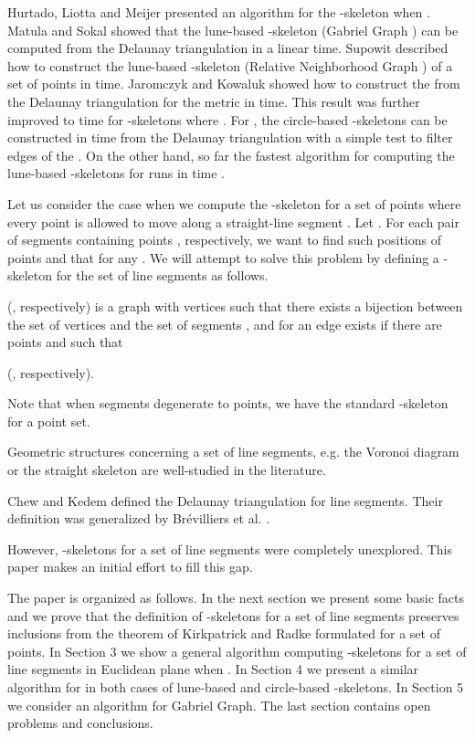 \documentclass[11pt]{llncs}
\begin{document}
Hurtado, Liotta and Meijer \cite{hlm03} presented an  algorithm for
the -skeleton when .
Matula and Sokal \cite{ms84} showed that the lune-based -skeleton (Gabriel Graph
) can be computed from the Delaunay triangulation in a linear time.
Supowit \cite{su83} described how to construct the lune-based -skeleton (Relative 
Neighborhood Graph ) of a set of  points in  time.
Jaromczyk and Kowaluk \cite{jk87} showed how to construct the  
from the Delaunay triangulation  for the  metric  
in  time.
This result was further improved to  time \cite{l94} for -skeletons 
where .
For , the  circle-based -skeletons can be 
constructed in  time from the  Delaunay triangulation  
with a simple test to filter edges of the   \cite{e02}.
On the other hand, so far the fastest algorithm for computing the lune-based 
-skeletons for  runs in  
time \cite{k12}.
 


 Let us consider the case when we compute the -skeleton for a set of  points 
 where every point  is allowed to move along a straight-line segment . 
Let . 
For each pair of segments  containing points , 
respectively, we want to find such positions of points  
and  that 
 for any . 
We will attempt to solve this problem 
by defining a -skeleton for the set of line segments  as follows.


\begin{definition}
 (, respectively) is a graph with  vertices such that there exists a bijection between the set of vertices and the set of segments ,
and for  an edge  exists
if there are points  and  such that 

(, 
respectively).
\end{definition}

Note that when segments degenerate to points, we have the standard -skeleton 
for a point set.

Geometric structures concerning a set of line segments, e.g. the Voronoi diagram 
\cite{bms84,pz13} or the straight skeleton \cite{aa96} are well-studied in the literature.

Chew and Kedem \cite{ck89} defined the Delaunay triangulation for line segments.
Their definition was generalized by Br\'{e}villiers et al. \cite{bcs07}.  

However, -skeletons for a set of line segments were completely unexplored.
This paper makes an initial effort to fill this gap.

The paper is organized as follows.
In the next section  we present some basic facts and we prove that 
the definition of -skeletons for a set of line segments preserves inclusions 
from the theorem of Kirkpatrick and Radke \cite{kr85} formulated for a set of points.
In Section 3 we show a general algorithm computing -skeletons for a set of line 
segments in Euclidean plane when . In Section 4 we present 
a similar algorithm for  in both cases of lune-based and circle-based 
-skeletons. In Section 5 we consider an algorithm for Gabriel Graph. 
The last section contains open problems and conclusions. 
\end{document}
